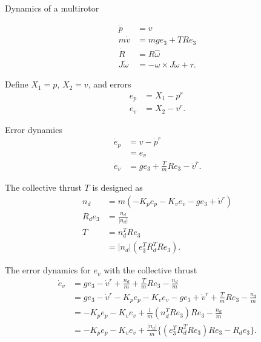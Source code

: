 \documentclass{article}
\begin{document}
Dynamics of a multirotor

\begin{align}
\dot{p} &= v \nonumber \\
m\dot{v} &= mge_3 + TRe_3 \nonumber \\
\dot{R} &= R\hat{\omega} \nonumber \\
J\dot{\omega} &= -\omega \times J\omega + \tau. \nonumber 
\end{align}

Define $X_1 = p$, $X_2 = v$, and errors
\begin{align}
e_p &= X_1 - p^r \nonumber \\
e_v &= X_2 - v^r. \nonumber
\end{align}

Error dynamics
\begin{align}
\dot{e}_p &= v - \dot{p}^r \nonumber \\
&= e_v \nonumber \\
\dot{e}_v &= ge_3 + \frac{T}{m}Re_3 - \dot{v}^r. \nonumber 
\end{align}

The collective thrust $T$ is designed as
\begin{align}
n_d &= m(-K_pe_p - K_ve_v -ge_3 + \dot{v}^r) \nonumber \\
R_de_3 &= \frac{n_d}{|n_d|}  \nonumber \\
T &= n_d^TRe_3 \nonumber \\
&= |n_d| (e_3^TR_d^TRe_3). \nonumber
\end{align}

The error dynamics for $e_v$ with the collective thrust
\begin{align}
\dot{e}_v &= ge_3 - \dot{v}^r + \frac{n_d}{m} +\frac{T}{m}Re_3 - \frac{n_d}{m}\nonumber \\
 &= ge_3 - \dot{v}^r  - K_pe_p - K_ve_v -ge_3 + \dot{v}^r +\frac{T}{m}Re_3 - \frac{n_d}{m} \nonumber  \\
&= -K_pe_p -K_ve_v  + \frac{1}{m}(n_d^TRe_3)Re_3 -\frac{n_d}{m} \nonumber \\
&= -K_pe_p-K_ve_v + \frac{|n_d|}{m}\{(e_3^TR_d^TRe_3)Re_3 - R_de_3\}. \nonumber
\end{align}
\end{document}
